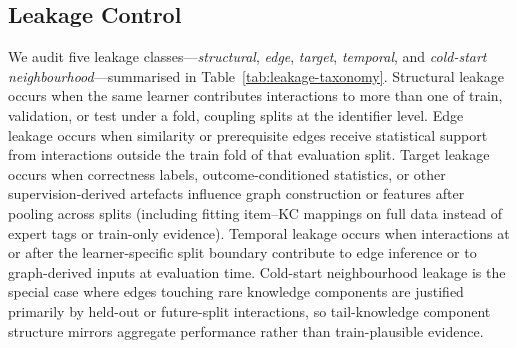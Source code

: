 \documentclass[pdflatex,sn-basic]{sn-jnl}
\newcommand{\KC}{knowledge component}
\newcommand{\KCs}{knowledge components}
\begin{document}
\subsection{Leakage Control}
\label{sec:leakage}
We audit five leakage classes---\emph{structural}, \emph{edge}, \emph{target},
\emph{temporal}, and \emph{cold-start neighbourhood}---summarised in
Table~\ref{tab:leakage-taxonomy}. Structural leakage occurs when the same
learner contributes interactions to more than one of train, validation, or test under a fold, coupling splits at the identifier level. Edge leakage occurs when similarity or
prerequisite edges receive statistical support from interactions
outside the train fold of that evaluation split. Target leakage occurs
when correctness labels, outcome-conditioned statistics, or other
supervision-derived artefacts influence graph construction or features
after pooling across splits (including fitting item--KC mappings on
full data instead of expert tags or train-only evidence). Temporal
leakage occurs when interactions at or after the learner-specific split
boundary contribute to edge inference or to graph-derived inputs at
evaluation time. Cold-start neighbourhood leakage is the special case
where edges touching rare \KCs{} are justified primarily by held-out or
future-split interactions, so tail-\KC{} structure mirrors aggregate
performance rather than train-plausible evidence.
\end{document}
